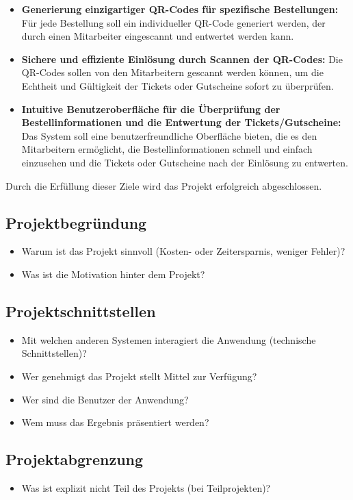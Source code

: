 \begin{itemize}
    \item \textbf{Generierung einzigartiger QR-Codes für spezifische Bestellungen:} Für jede Bestellung soll ein individueller QR-Code generiert werden, der durch einen Mitarbeiter eingescannt und entwertet werden kann.
    \item \textbf{Sichere und effiziente Einlösung durch Scannen der QR-Codes:} Die QR-Codes sollen von den Mitarbeitern gescannt werden können, um die Echtheit und Gültigkeit der Tickets oder Gutscheine sofort zu überprüfen.
    \item \textbf{Intuitive Benutzeroberfläche für die Überprüfung der Bestellinformationen und die Entwertung der Tickets/Gutscheine:} Das System soll eine benutzerfreundliche Oberfläche bieten, die es den Mitarbeitern ermöglicht, die Bestellinformationen schnell und einfach einzusehen und die Tickets oder Gutscheine nach der Einlösung zu entwerten.
\end{itemize}

Durch die Erfüllung dieser Ziele wird das Projekt erfolgreich abgeschlossen.

\subsection{Projektbegründung} 
\label{sec:Projektbegruendung}
\begin{itemize}
	\item Warum ist das Projekt sinnvoll (\zB Kosten- oder Zeitersparnis, weniger Fehler)?
	\item Was ist die Motivation hinter dem Projekt?
\end{itemize}


\subsection{Projektschnittstellen} 
\label{sec:Projektschnittstellen}
\begin{itemize}
	\item Mit welchen anderen Systemen interagiert die Anwendung (technische Schnittstellen)?
	\item Wer genehmigt das Projekt \bzw stellt Mittel zur Verfügung? 
	\item Wer sind die Benutzer der Anwendung?
	\item Wem muss das Ergebnis präsentiert werden?
\end{itemize}


\subsection{Projektabgrenzung} 
\label{sec:Projektabgrenzung}
\begin{itemize}
	\item Was ist explizit nicht Teil des Projekts (\insb bei Teilprojekten)?
\end{itemize}
